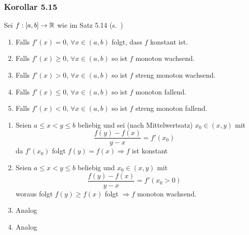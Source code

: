 \subsubsection*{Korollar 5.15}
Sei $f:\lbrack a,b\rbrack\to\mathbb{R}$ wie im Satz 5.14 (s.~\pageref{satz5.14})
\begin{enumerate}
\item Falls $f'(x)=0$, $\forall x\in\left( a,b\right)$ folgt, dass $f$ konstant ist.
\item Falls $f'(x)\geq 0$, $\forall x\in\left( a,b\right)$ so ist $f$ monoton wachsend.
\item Falls $f'(x)> 0$, $\forall x\in\left( a,b\right)$ so ist $f$ streng monoton wachsend.
\item Falls $f'(x)\leq 0$, $\forall x\in\left( a,b\right)$ so ist $f$ monoton fallend.
\item Falls $f'(x)< 0$, $\forall x\in\left( a,b\right)$ so ist $f$ streng monoton fallend.
\end{enumerate}

\begin{beweis}{}
\begin{enumerate}
\item Seien $a\leq x<y\leq b$ beliebig und sei (nach Mittelwertsatz) $x_0\in\left( x,y\right)$ mit
\[\frac{{f\left( y \right) - f\left( x \right)}}{{y - x}} = f'\left( {{x_0}} \right)\]
da $f'\left( x_0\right)$ folgt $f\left( y\right)=f(x)\Rightarrow f$ ist konstant
\item Seien $a\leq x<y\leq b$ beliebig und  $x_0\in\left( x,y\right)$ mit
\[\frac{{f\left( y \right) - f\left( x \right)}}{{y - x}} = f'\left( {{x_0}}>0 \right)\]
woraus folgt  $f\left( y\right)\geq f(x)$  folgt $\Rightarrow f$ monoton wachsend.
\item Analog
\item Analog
\end{enumerate}
\end{beweis}

